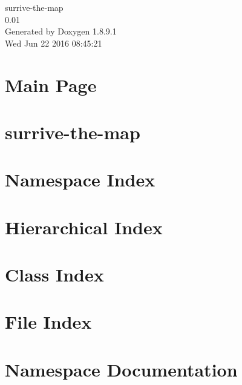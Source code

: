 \documentclass[twoside]{book}
\newcommand{\+}{\discretionary{\mbox{\scriptsize$\hookleftarrow$}}{}{}}
\newcommand{\clearemptydoublepage}{%
  \newpage{\pagestyle{empty}\cleardoublepage}%
}
\begin{document}
\hypersetup{pageanchor=false,
             bookmarks=true,
             bookmarksnumbered=true,
             pdfencoding=unicode
            }
\begin{titlepage}
\vspace*{7cm}
\begin{center}%
{\Large surrive-\/the-\/map \\[1ex]\large 0.\+01 }\\
\vspace*{1cm}
{\large Generated by Doxygen 1.8.9.1}\\
\vspace*{0.5cm}
{\small Wed Jun 22 2016 08:45:21}\\
\end{center}
\end{titlepage}
\clearemptydoublepage
\tableofcontents
\clearemptydoublepage
{}
\hypersetup{pageanchor=true}

\chapter{Main Page}
\label{index}\hypertarget{index}{}
\chapter{surrive-\/the-\/map}
\label{md__c_1__users__foto__documents__git_hub_surrive-the-map__r_e_a_d_m_e}
\hypertarget{md__c_1__users__foto__documents__git_hub_surrive-the-map__r_e_a_d_m_e}{}

\chapter{Namespace Index}

\chapter{Hierarchical Index}

\chapter{Class Index}

\chapter{File Index}

\chapter{Namespace Documentation}

\end{document}
